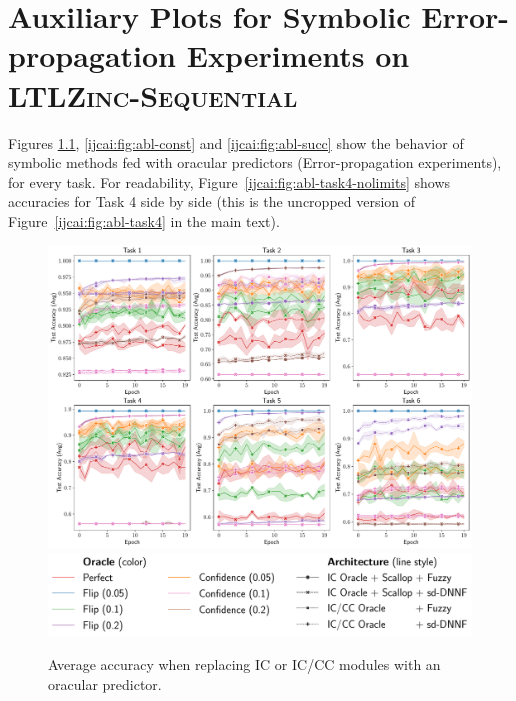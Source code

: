 \chapter{Auxiliary Plots for Symbolic Error-propagation Experiments on \textsc{LTLZinc-Sequential}}\label{app:ltlzincoracle}
Figures \ref{ijcai:fig:abl-avg}, \ref{ijcai:fig:abl-const} and \ref{ijcai:fig:abl-succ} show the behavior of symbolic methods fed with oracular predictors (Error-propagation experiments), for every task. For readability, Figure~\ref{ijcai:fig:abl-task4-nolimits} shows accuracies for Task 4 side by side (this is the uncropped  version of Figure~\ref{ijcai:fig:abl-task4} in the main text).

\begin{figure}
	\centering
	\includegraphics[width=\linewidth]{imgs/ijcai/ablation_avg_full.pdf}
	\includegraphics[width=\linewidth]{imgs/ijcai/ablation_task4_legend.pdf}
	\caption{Average accuracy when replacing \textsc{IC} or \textsc{IC/CC} modules with an oracular predictor.}
	\label{ijcai:fig:abl-avg}
\end{figure}

